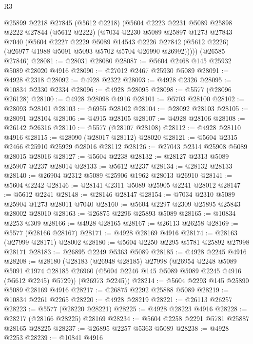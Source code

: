 \begin{lexlean}{R3}
\begin{coremodule}
      @25899
      @2218
      @27845
      (@5612 @2218)
      (@5604
        @2223
        @2231
        @5089
        @25898
        @2222
        @27844
        (@5612 @2222)
        (@7034
          @2230
          @5089
          @25897
          @1273
          @27843
          @7040
          (@5604
            @2227
            @2229
            @5089
            @14543
            @2226
            @27842
            (@5612 @2226)
            (@26977 @1988 @5091 @5093 @5702 @5704 @26990 @26992)))))
    (@26585 @27846)
@28081 := @28031 @28080
@28087 := @5604 @2468 @145 @25932 @5089 @28020 @4916
@28090 := @27012 @2467 @25930 @5089
@28091 := @4928 @2318
@28092 := @4928 @2322
@28093 := @4928 @2326
@28095 := @10834 @2330 @2334
@28096 := @4928 @28095
@28098 := @5577 (@28096 @26128)
@28100 := @4928 @28098 @4916
@28101 := @5703 @28100
@28102 := @28093 @28101
@28103 := @6955 @28102
@28104 := @28092 @28103
@28105 := @28091 @28104
@28106 := @4915 @28105
@28107 := @4928 @28106
@28108 := @26142 @26316
@28110 := @5577 (@28107 @28108)
@28112 := @4928 @28110 @4916
@28115 := @28090 (@28017 @28112) @28020
@28121 := @5604 @2315 @2466 @25910 @25929 @28016 @28112
@28126 := @27043 @2314 @25908 @5089 @28015 @28016
@28127 := @5604 @2238
@28132 := @28127 @2313 @5089 @25907 @2237 @28014
@28133 := @5612 @2237
@28134 := @28132 @28133
@28140 := @26904 @2312 @5089 @25906 @1962 @28013 @26910
@28141 := @5604 @2242
@28146 := @28141 @2311 @5089 @25905 @2241 @28012
@28147 := @5612 @2241
@28148 := @28146 @28147
@28154 := @7034 @2310 @5089 @25904 @1273 @28011 @7040
@28160 := @5604 @2297 @2309 @25895 @25843 @28002 @28010
@28163 := @26875 @2296 @25893 @5089
@28165 := @10834 @2253 @309
@28166 := @4928 @28165
@28167 := @26113 @26258
@28169 := @5577 (@28166 @28167)
@28171 := @4928 @28169 @4916
@28174 := @28163 (@27999 @28171) @28002
@28180 := @5604 @2250 @2295 @5781 @25892 @27998 @28171
@28183 := @26895 @2249 @5363 @5089
@28185 := @4928 @2245 @4916
@28208 := @28180
    (@28183
      (@26948 @28185)
      @27998
      (@26954
        @2248
        @5089
        @5091
        @1974
        @28185
        @26960
        (@5604 @2246 @145 @5089 @5089 @2245 @4916 (@5612 @2245) @5729))
      (@26973 @2245))
@28214 := @5604 @2293 @145 @25890 @5089 @28169 @4916
@28217 := @26875 @2292 @25888 @5089
@28219 := @10834 @2261 @2265
@28220 := @4928 @28219
@28221 := @26113 @26257
@28223 := @5577 (@28220 @28221)
@28225 := @4928 @28223 @4916
@28228 := @28217 (@28166 @28225) @28169
@28234 := @5604 @2258 @2291 @5781 @25887 @28165 @28225
@28237 := @26895 @2257 @5363 @5089
@28238 := @4928 @2253
@28239 := @10841 @4916

\end{coremodule}
\end{lexlean}
